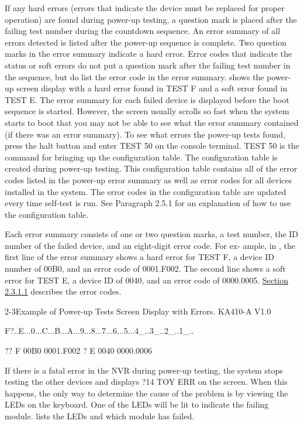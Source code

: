 If any hard errors (errors that indicate the device must be replaced for
proper operation) are found during power-up testing, a question mark is
placed after the failing test number during the countdown sequence. An
error summary of all errors detected is listed after the power-up sequence
is complete. Two question marks in the error summary indicate a hard error.
Error codes that indicate the status or soft errors do not put a question mark
after the failing test number in the sequence, but do list the error code in the
error summary.  shows the power-up screen display with a hard
error found in TEST F and a soft error found in TEST E. The error summary
for each failed device is displayed before the boot sequence is started.
However, the screen usually scrolls so fast when the system starts to boot
that you may not be able to see what the error summary contained (if there
was an error summary). To see what errors the power-up tests found, press
the halt button and enter TEST 50 on the console terminal. TEST 50 is the
command for bringing up the configuration table. The configuration table
is created during power-up testing. This configuration table contains all of
the error codes listed in the power-up error summary as well as error codes
for all devices installed in the system. The error codes in the configuration
table are updated every time self-test is run. See Paragraph 2.5.1 for an
explanation of how to use the configuration table.

Each error summary consists of one or two question marks, a test number,
the ID number of the failed device, and an eight-digit error code. For ex-
ample, in , the first line of the error summary shows a hard error
for TEST F, a device ID number of 00B0, and an error code of 0001.F002.
The second line shows a soft error for TEST E, a device ID of 0040, and an
error code of 0000.0005. \hyperlink{subsubsection.2.3.1.1}{Section 2.3.1.1} describes the error codes.
\newpage
\begin{ttfig}{2-3}{Example of Power-up Tests Screen Display with Errors.}
KA410-A V1.0

F?..E...0...C...B...A...9...8...7...6...5...4_..3_..2_..1_..

?? F  00B0  0001.F002
 ? E  0040  0000.0006
\end{ttfig}

If there is a fatal error in the NVR during power-up testing, the system stops
testing the other devices and displays ?14 TOY ERR on the screen. When
this happens, the only way to determine the cause of the problem is by
viewing the LEDs on the keyboard. One of the LEDs will be lit to indicate
the failing module.  lists the LEDs and which module has failed.

